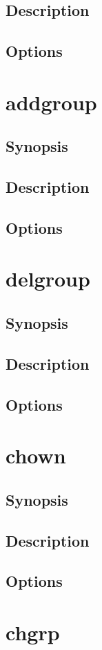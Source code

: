\documentclass[a4paper, 10pt, onecolumn, openright, oneside]{book}
\begin{document}
			\subsection{Description}
			\subsection{Options}
		\section{addgroup}
			\subsection{Synopsis}
			\subsection{Description}
			\subsection{Options}
		\section{delgroup}
			\subsection{Synopsis}
			\subsection{Description}
			\subsection{Options}
		\section{chown}
			\subsection{Synopsis}
			\subsection{Description}
			\subsection{Options}
		\section{chgrp}
\end{document}
